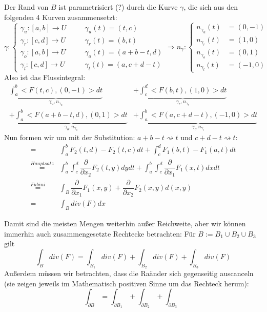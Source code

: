 \documentclass[main.tex]{subfiles}
\begin{document}
\begin{Beweis}
  Der Rand von $B$ ist parametrisiert (?) durch die Kurve $\gamma$, die sich aus den folgenden 4 Kurven zusammensetzt:
  $$\gamma : \left\{ \begin{aligned}
    \gamma_u : [a,b] \to U & \quad & \gamma_u(t) = (t,c) \\
    \gamma_r : [c,d] \to U & \quad & \gamma_r(t) = (b,t) \\
    \gamma_o : [a,b] \to U & \quad & \gamma_o(t) = (a+b -t,d) \\
    \gamma_l : [c,d] \to U & \quad & \gamma_l(t) = (a,c+d -t)
  \end{aligned}\right.
  \Rightarrow n_\gamma : \left\{ \begin{aligned}
    n_{\gamma_u}(t) & = (0,-1) \\
    n_{\gamma_r}(t) & = (1,0) \\
    n_{\gamma_o}(t) & = (0,1) \\
    n_{\gamma_l}(t) & = (-1,0)
  \end{aligned}\right.$$
  Also ist das Flussintegral:
  $$\begin{aligned}
    \underbrace{\int_a^b <F(t,c),(0,-1)> dt}_{\gamma_u, n_{\gamma_u}} & +
    \underbrace{\int_c^d <F(b,t),(1,0)> dt}_{\gamma_r, n_{\gamma_r}} \\
    + \underbrace{\int_a^b <F(a+b - t,d),(0,1)> dt}_{\gamma_o, n_{\gamma_o}} & +
    \underbrace{\int_a^b <F(a ,c + d - t),(-1,0)> dt}_{\gamma_l, n_{\gamma_l}}
  \end{aligned}$$
  Nun formen wir um mit der Substitution: $a+ b - t \rightsquigarrow t$ und $c + d - t \rightsquigarrow t$:
  $$\begin{aligned}
    = & \int_a^b F_2 (t,d) - F_2 (t,c) dt + \int_c^d F_1(b,t) - F_1(a,t)dt \\
    \stackrel{\scriptscriptstyle Hauptsatz}{=} & \int_a^b \int_c^d \dfrac{\partial}{\partial x_2} F_2(t,y) dy dt + \int_a^b \int_c^d \dfrac{\partial}{\partial x_1} F_1(x,t)dx dt \\
    \stackrel{\scriptscriptstyle Fubini}{=} & \int_B \dfrac{\partial}{\partial x_1} F_1(x,y) + \dfrac{\partial}{\partial x_2} F_2(x,y) d(x,y) \\
    = & \int_B div(F) dx
  \end{aligned}$$
\end{Beweis}

\begin{Bemerkung}
  Damit sind die meisten Mengen weiterhin außer Reichweite, aber wir können immerhin auch zusammengesetzte Rechtecke betrachten:
  Für $B := B_1 \cup B_2 \cup B_3$ gilt
  $$\int_B div(F) = \int_{B_1} div(F) + \int_{B_2} div(F) + \int_{B_3} div(F)$$
  Außerdem müssen wir betrachten, dass die Raänder sich gegenseitig auscanceln (sie zeigen jeweils im Mathematisch positiven Sinne um das Rechteck herum):
  $$\int_{\partial B} = \int_{\partial B_1} + \int_{\partial B_2} +\int_{\partial B_3}$$
\end{Bemerkung}
\end{document}
